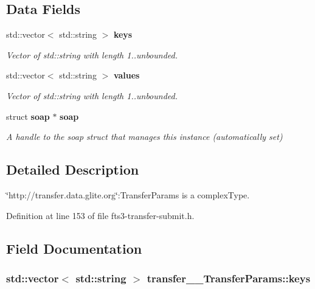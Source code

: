 \subsection*{Data Fields}
\begin{DoxyCompactItemize}
\item 
std::vector$<$ std::string $>$ {\bf keys}
\begin{DoxyCompactList}\small\item\em Vector of std::string with length 1..unbounded. \item\end{DoxyCompactList}\item 
std::vector$<$ std::string $>$ {\bf values}
\begin{DoxyCompactList}\small\item\em Vector of std::string with length 1..unbounded. \item\end{DoxyCompactList}\item 
struct {\bf soap} $\ast$ {\bf soap}\label{classtransfer____TransferParams_a9ea0e57bdb9dc72a1f329eef83e32547}

\begin{DoxyCompactList}\small\item\em A handle to the soap struct that manages this instance (automatically set) \item\end{DoxyCompactList}\end{DoxyCompactItemize}


\subsection{Detailed Description}
\char`\"{}http://transfer.data.glite.org\char`\"{}:TransferParams is a complexType. 

Definition at line 153 of file fts3-\/transfer-\/submit.h.



\subsection{Field Documentation}
\subsubsection[{keys}]{\setlength{\rightskip}{0pt plus 5cm}std::vector$<$ std::string $>$ {\bf transfer\_\-\_\-TransferParams::keys}}\label{classtransfer____TransferParams_a141364cc99cab03aab48e642905bcac5}


